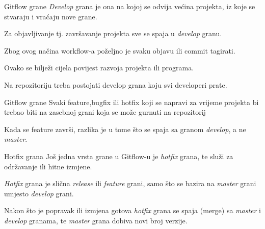 \documentclass[10pt]{beamer}
\begin{document}
\begin{frame}{Gitflow grane}
\textit{Develop} grana je ona na kojoj se odvija većina projekta, iz koje se stvaraju i vraćaju nove grane.

Za objavljivanje tj. završavanje projekta sve se spaja u \textit{develop} granu.

Zbog ovog načina workflow-a poželjno je svaku objavu ili commit tagirati.

Ovako se bilježi cijela povijest razvoja projekta ili programa.

Na repozitoriju treba postojati develop grana koju svi developeri prate.

\end{frame}
\begin{frame}{Gitflow grane}
Svaki feature,bugfix ili hotfix koji se napravi za vrijeme projekta bi trebao biti na zasebnoj grani koja se može gurnuti na repozitorij

Kada se feature završi, razlika je u tome što se spaja sa granom \textit{develop}, a ne \textit{master}.

{
\setlength{\fboxsep}{1pt}
\setlength{\fboxrule}{1pt}
}
\end{frame}
\begin{frame}{Hotfix grana}
Još jedna vrsta grane u Gitflow-u je \textit{hotfix} grana, te služi za održavanje ili hitne izmjene.

\textit{Hotfix} grana je slična \textit{release} ili \textit{feature} grani, samo što se bazira na \textit{master} grani umjesto \textit{develop} grani.

Nakon što je popravak ili izmjena gotova \textit{hotfix} grana se spaja (merge) sa \textit{master} i \textit{develop} granama, te \textit{master} grana dobiva novi broj verzije.
{
\setlength{\fboxsep}{1pt}
\setlength{\fboxrule}{1pt}
}
\end{frame}
\end{document}

